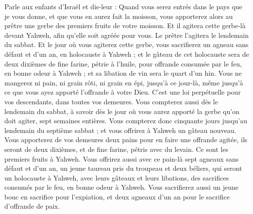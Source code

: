 \begin{multicols}{2}
Parle aux enfants d'Israël et dis-leur : Quand vous serez entrés dans le pays que je vous donne, et que vous en aurez fait la moisson, vous apporterez alors au prêtre une gerbe des premiers fruits de votre moisson.
Et il agitera cette gerbe-là devant Yahweh, afin qu'elle soit agréée pour vous. Le prêtre l'agitera le lendemain du sabbat.
Et le jour où vous agiterez cette gerbe, vous sacrifierez un agneau sans défaut et d'un an, en holocauste à Yahweh ;
et le gâteau de cet holocauste sera de deux dixièmes de fine farine, pétrie à l'huile, pour offrande consumée par le feu, en bonne odeur à Yahweh ; et sa libation de vin sera le quart d'un hin.
Vous ne mangerez ni pain, ni grain rôti, ni grain en épi, jusqu'à ce jour-là, même jusqu'à ce que vous ayez apporté l'offrande à votre Dieu. C'est une loi perpétuelle pour vos descendants, dans toutes vos demeures.
Vous compterez aussi dès le lendemain du sabbat, à savoir dès le jour où vous aurez apporté la gerbe qu'on doit agiter, sept semaines entières.
Vous compterez donc cinquante jours jusqu'au lendemain du septième sabbat ; et vous offrirez à Yahweh un gâteau nouveau.
Vous apporterez de vos demeures deux pains pour en faire une offrande agitée, ils seront de deux dixièmes, et de fine farine, pétris avec du levain. Ce sont les premiers fruits à Yahweh.
Vous offrirez aussi avec ce pain-là sept agneaux sans défaut et d'un an, un jeune taureau pris du troupeau et deux béliers, qui seront un holocauste à Yahweh, avec leurs gâteaux et leurs libations, des sacrifices consumés par le feu, en bonne odeur à Yahweh.
Vous sacrifierez aussi un jeune bouc en sacrifice pour l'expiation, et deux agneaux d'un an pour le sacrifice d'offrande de paix.

\end{multicols}
